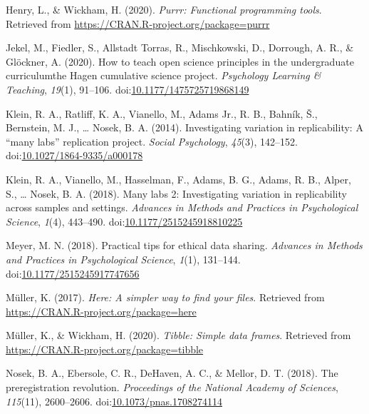 \documentclass[
  man,mask,floatsintext]{apa6}
\newlength{\cslhangindent}
\newenvironment{cslreferences}%
  {\setlength{\parindent}{0pt}%
  \everypar{\setlength{\hangindent}{\cslhangindent}}\ignorespaces}%
  {\par}
\begin{document}
\begin{cslreferences}
\leavevmode\hypertarget{ref-R-purrr}{}%
Henry, L., \& Wickham, H. (2020). \emph{Purrr: Functional programming tools}. Retrieved from \url{https://CRAN.R-project.org/package=purrr}

\leavevmode\hypertarget{ref-jekelHowTeachOpen2020}{}%
Jekel, M., Fiedler, S., Allstadt Torras, R., Mischkowski, D., Dorrough, A. R., \& Glöckner, A. (2020). How to teach open science principles in the undergraduate curriculumthe Hagen cumulative science project. \emph{Psychology Learning \& Teaching}, \emph{19}(1), 91--106. doi:\href{https://doi.org/10.1177/1475725719868149}{10.1177/1475725719868149}

\leavevmode\hypertarget{ref-kleinInvestigatingVariationReplicability2014}{}%
Klein, R. A., Ratliff, K. A., Vianello, M., Adams Jr., R. B., Bahník, Š., Bernstein, M. J., \ldots{} Nosek, B. A. (2014). Investigating variation in replicability: A ``many labs'' replication project. \emph{Social Psychology}, \emph{45}(3), 142--152. doi:\href{https://doi.org/10.1027/1864-9335/a000178}{10.1027/1864-9335/a000178}

\leavevmode\hypertarget{ref-kleinManyLabsInvestigating2018}{}%
Klein, R. A., Vianello, M., Hasselman, F., Adams, B. G., Adams, R. B., Alper, S., \ldots{} Nosek, B. A. (2018). Many labs 2: Investigating variation in replicability across samples and settings. \emph{Advances in Methods and Practices in Psychological Science}, \emph{1}(4), 443--490. doi:\href{https://doi.org/10.1177/2515245918810225}{10.1177/2515245918810225}

\leavevmode\hypertarget{ref-meyerPracticalTipsEthical2018}{}%
Meyer, M. N. (2018). Practical tips for ethical data sharing. \emph{Advances in Methods and Practices in Psychological Science}, \emph{1}(1), 131--144. doi:\href{https://doi.org/10.1177/2515245917747656}{10.1177/2515245917747656}

\leavevmode\hypertarget{ref-R-here}{}%
Müller, K. (2017). \emph{Here: A simpler way to find your files}. Retrieved from \url{https://CRAN.R-project.org/package=here}

\leavevmode\hypertarget{ref-R-tibble}{}%
Müller, K., \& Wickham, H. (2020). \emph{Tibble: Simple data frames}. Retrieved from \url{https://CRAN.R-project.org/package=tibble}

\leavevmode\hypertarget{ref-nosekPreregistrationRevolution2018}{}%
Nosek, B. A., Ebersole, C. R., DeHaven, A. C., \& Mellor, D. T. (2018). The preregistration revolution. \emph{Proceedings of the National Academy of Sciences}, \emph{115}(11), 2600--2606. doi:\href{https://doi.org/10.1073/pnas.1708274114}{10.1073/pnas.1708274114}


\end{cslreferences}
\end{document}
